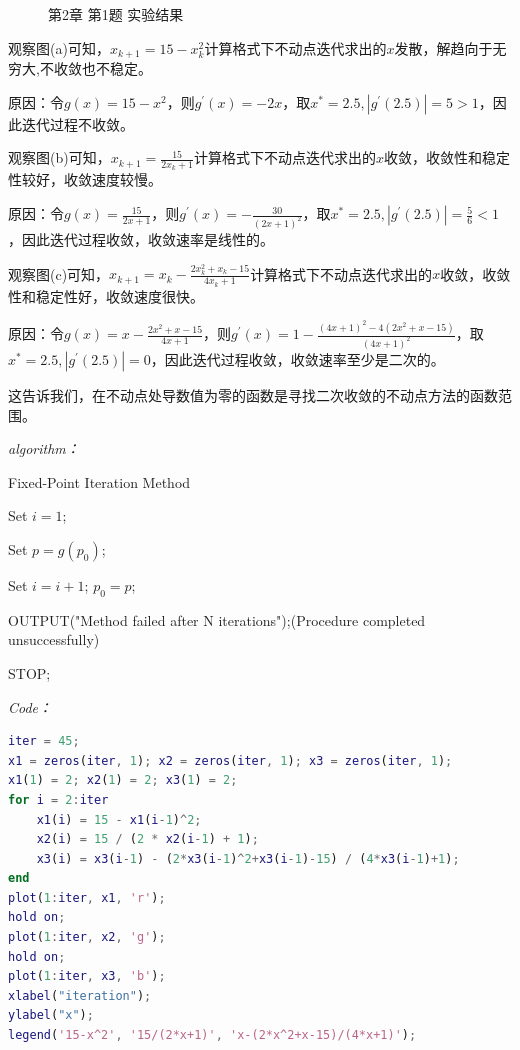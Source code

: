 \documentclass[12pt]{ctexart}
\begin{document}
\begin{figure}[htbp]
{		}
	\caption{第2章 第1题 实验结果}
	\end{figure}
	
	观察图(a)可知，$x_{k+1}=15-x_k^2$计算格式下不动点迭代求出的$x$发散，解趋向于无穷大,不收敛也不稳定。
	
	原因：令$g(x)=15-x^2$，则$g^{'}(x)=-2x$，取$x^*=2.5,|g^{'}(2.5)|=5>1$，因此迭代过程不收敛。
	
	观察图(b)可知，$x_{k+1}=\frac{15}{2x_k+1}$计算格式下不动点迭代求出的$x$收敛，收敛性和稳定性较好，收敛速度较慢。
	
	原因：令$g(x)=\frac{15}{2x+1}$，则$g^{'}(x)=-\frac{30}{(2x+1)^2}$，取$x^*=2.5,|g^{'}(2.5)|=\frac{5}{6}<1$，因此迭代过程收敛，收敛速率是线性的。
	
	观察图(c)可知，$x_{k+1}=x_k-\frac{2x_k^2+x_k-15}{4x_k+1}$计算格式下不动点迭代求出的$x$收敛，收敛性和稳定性好，收敛速度很快。

	原因：令$g(x)=x-\frac{2x^2+x-15}{4x+1}$，则$g^{'}(x)=1-\frac{(4x+1)^2-4(2x^2+x-15)}{(4x+1)^2}$，取$x^*=2.5,|g^{'}(2.5)|=0$，因此迭代过程收敛，收敛速率至少是二次的。
	
	这告诉我们，在不动点处导数值为零的函数是寻找二次收敛的不动点方法的函数范围。
		
	\textit{algorithm：}
	
	\begin{algorithm}
		\caption{Fixed-Point Iteration Method}
		Set $i=1$;
		
		{
			Set $p=g(p_0)$;
			
			
			Set $i=i+1$; $p_0=p$;
		}
		
		OUTPUT("Method failed after N iterations");(Procedure completed unsuccessfully)
		
		STOP;
	\end{algorithm}
	
	\textit{Code：}
	
	\begin{lstlisting}[language = MATLAB]
% 第2章第1题
iter = 45;
x1 = zeros(iter, 1); x2 = zeros(iter, 1); x3 = zeros(iter, 1);
x1(1) = 2; x2(1) = 2; x3(1) = 2;
for i = 2:iter
	x1(i) = 15 - x1(i-1)^2;
	x2(i) = 15 / (2 * x2(i-1) + 1);
	x3(i) = x3(i-1) - (2*x3(i-1)^2+x3(i-1)-15) / (4*x3(i-1)+1);
end
plot(1:iter, x1, 'r');
hold on;
plot(1:iter, x2, 'g');
hold on;
plot(1:iter, x3, 'b');
xlabel("iteration");
ylabel("x");
legend('15-x^2', '15/(2*x+1)', 'x-(2*x^2+x-15)/(4*x+1)');
	\end{lstlisting}
	
\end{document}

